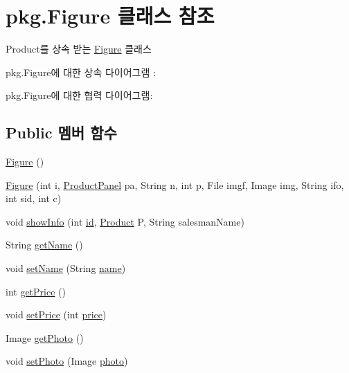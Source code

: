 \hypertarget{classpkg_1_1_figure}{}\section{pkg.\+Figure 클래스 참조}
\label{classpkg_1_1_figure}


Product를 상속 받는 \hyperlink{classpkg_1_1_figure}{Figure} 클래스  




pkg.\+Figure에 대한 상속 다이어그램 \+: 


pkg.\+Figure에 대한 협력 다이어그램\+:
\subsection*{Public 멤버 함수}
\begin{DoxyCompactItemize}
\item 
\hyperlink{classpkg_1_1_figure_a34579ab35db102ae5e3b69a901b43d82}{Figure} ()
\item 
\hyperlink{classpkg_1_1_figure_a6a894101159b66bf647f8ae1aa1df641}{Figure} (int i, \hyperlink{classpkg_1_1_product_panel}{Product\+Panel} pa, String n, int p, File imgf, Image img, String ifo, int sid, int c)
\item 
void \hyperlink{classpkg_1_1_figure_a7c13eb5cfeb173a5a6bd50b05b2c51b7}{show\+Info} (int \hyperlink{classpkg_1_1_product_ac7846687b2d11faba3be1395fcbbab72}{id}, \hyperlink{classpkg_1_1_product}{Product} P, String salesman\+Name)
\item 
String \hyperlink{classpkg_1_1_product_a33ff6f7a51fc667ad2d2cc670424908c}{get\+Name} ()
\item 
void \hyperlink{classpkg_1_1_product_a9751f56879a4e8b76f958b26aaab4ec1}{set\+Name} (String \hyperlink{classpkg_1_1_product_acdadb9558664acdfd23eff5b2b77ae90}{name})
\item 
int \hyperlink{classpkg_1_1_product_af93b4414ec143311db57e6e4586d129e}{get\+Price} ()
\item 
void \hyperlink{classpkg_1_1_product_ad090e3760620ffe3fa253b169c84eb29}{set\+Price} (int \hyperlink{classpkg_1_1_product_a46c6eb6906d4ee2f6393515f41dba7c9}{price})
\item 
Image \hyperlink{classpkg_1_1_product_acb7237be160d1df9bcfda96a618f23dc}{get\+Photo} ()
\item 
void \hyperlink{classpkg_1_1_product_a2bb5fef6a450832b5d1c8121faeee53c}{set\+Photo} (Image \hyperlink{classpkg_1_1_product_a5d279eb4556860b90305cc26a3ee69be}{photo})
\item 

\end{DoxyCompactItemize}
